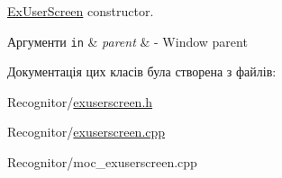 \hyperlink{classExUserScreen}{Ex\-User\-Screen} constructor. 


\begin{DoxyParams}[1]{Аргументи}
\mbox{\tt in}  & {\em parent} & -\/ Window parent \\
\hline
\end{DoxyParams}


Документація цих класів була створена з файлів\-:\begin{DoxyCompactItemize}
\item 
Recognitor/\hyperlink{exuserscreen_8h}{exuserscreen.\-h}\item 
Recognitor/\hyperlink{exuserscreen_8cpp}{exuserscreen.\-cpp}\item 
Recognitor/moc\-\_\-exuserscreen.\-cpp\end{DoxyCompactItemize}
